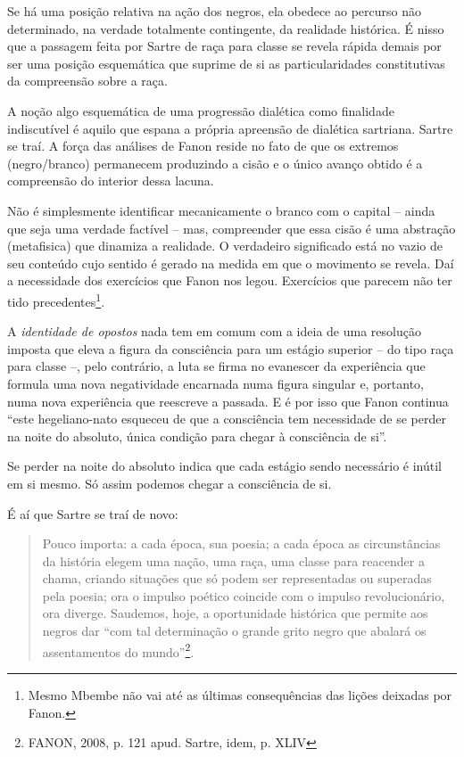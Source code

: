 Se há uma posição relativa na ação dos negros, ela obedece ao percurso
não determinado, na verdade totalmente contingente, da realidade
histórica. É nisso que a passagem feita por Sartre de raça para classe
se revela rápida demais por ser uma posição esquemática que suprime de
si as particularidades constitutivas da compreensão sobre a raça.

A noção algo esquemática de uma progressão dialética como finalidade
indiscutível é aquilo que espana a própria apreensão de dialética
sartriana. Sartre se traí. A força das análises de Fanon reside no fato
de que os extremos (negro/branco) permanecem produzindo a cisão e o
único avanço obtido é a compreensão do interior dessa lacuna.

Não é simplesmente identificar mecanicamente o branco com o capital --
ainda que seja uma verdade factível -- mas, compreender que essa cisão é
uma abstração (metafisica) que dinamiza a realidade. O verdadeiro
significado está no vazio de seu conteúdo cujo sentido é gerado na
medida em que o movimento se revela. Daí a necessidade dos exercícios
que Fanon nos legou. Exercícios que parecem não ter tido
precedentes\footnote{Mesmo Mbembe não vai até as últimas consequências
  das lições deixadas por Fanon.}.

A \emph{identidade de opostos} nada tem em comum com a ideia de uma
resolução imposta que eleva a figura da consciência para um estágio
superior -- do tipo raça para classe --, pelo contrário, a luta se firma
no evanescer da experiência que formula uma nova negatividade encarnada
numa figura singular e, portanto, numa nova experiência que reescreve a
passada. E é por isso que Fanon continua ``este hegeliano-nato esqueceu
de que a consciência tem necessidade de se perder na noite do absoluto,
única condição para chegar à consciência de si''.

Se perder na noite do absoluto indica que cada estágio sendo necessário
é inútil em si mesmo. Só assim podemos chegar a consciência de si.

É aí que Sartre se traí de novo:

\begin{quote}
Pouco importa: a cada época, sua poesia; a cada época as circunstâncias
da história elegem uma nação, uma raça, uma classe para reacender a
chama, criando situações que só podem ser representadas ou superadas
pela poesia; ora o impulso poético coincide com o impulso
revolucionário, ora diverge. Saudemos, hoje, a oportunidade histórica
que permite aos negros dar ``com tal determinação o grande grito negro
que abalará os assentamentos do mundo''\footnote{FANON, 2008, p. 121
  apud. Sartre, idem, p. XLIV}.
\end{quote}

